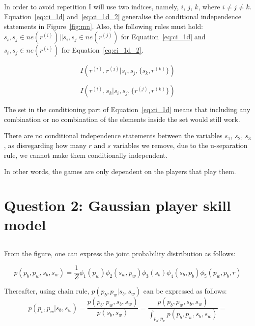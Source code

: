 \documentclass[a4paper,11pt]{article}
\theoremstyle{mytheor}
\begin{document}
\subsection{}
\label{sec:1d}

In order to avoid repetition I will use two indices, namely, $i$, $j$, $k$, where $i \neq j \neq k$. Equation~\ref{eq:ci_1d} and~\ref{eq:ci_1d_2} generalise the conditional independence statements in Figure~\ref{fig:mn}. Also, the following rules must hold: $s_i, s_j \in ne(r^{(i)}) || s_i, s_j \in ne(r^{(j)})$ for Equation~\ref{eq:ci_1d} and $s_i, s_j \in ne(r^{(i)})$ for Equation~\ref{eq:ci_1d_2}.

\begin{equation}
    \label{eq:ci_1d}
    I(r^{(i)}, r^{(j)} |s_i,s_j,\{s_k, r^{(k)}\})
\end{equation}

\begin{equation}
    \label{eq:ci_1d_2}
    I(r^{(i)}, s_k | s_i,s_j,\{r^{(j)}, r^{(k)}\})
\end{equation}

The set in the conditioning part of Equation~\ref{eq:ci_1d} means that including any combination or no combination of the elements inside the set would still work.

There are no conditional independence statements between the variables $s_1$, $s_2$, $s_3$, as disregarding how many $r$ and $s$ variables we remove, due to the u-separation rule, we cannot make them conditionally independent.

In other words, the games are only dependent on the players that play them.

\section{Question 2: Gaussian player skill model}
\subsection{}
From the figure, one can express the joint probability distribution as follows:

\begin{equation}
    \label{eq:joint_distr}
    p(p_b,p_w,s_b,s_w) = \frac{1}{Z}\phi_{1}(p_w)\phi_{2}(s_w,p_w)\phi_{3}(s_b)\phi_{4}(s_b,p_b)\phi_{5}(p_w,p_b,r)
\end{equation}

Thereafter, using chain rule, $p(p_b,p_w|s_b,s_w)$ can be expressed as follows:
\begin{equation}
    \label{eq:chain_rule}
    p(p_b,p_w|s_b,s_w) = \frac{p(p_b,p_w,s_b,s_w)}{p(s_b,s_w)} = \frac{p(p_b,p_w,s_b,s_w)}{\int_{p_b,p_w} p(p_b,p_w,s_b,s_w)}= 
\end{equation}
\end{document}
